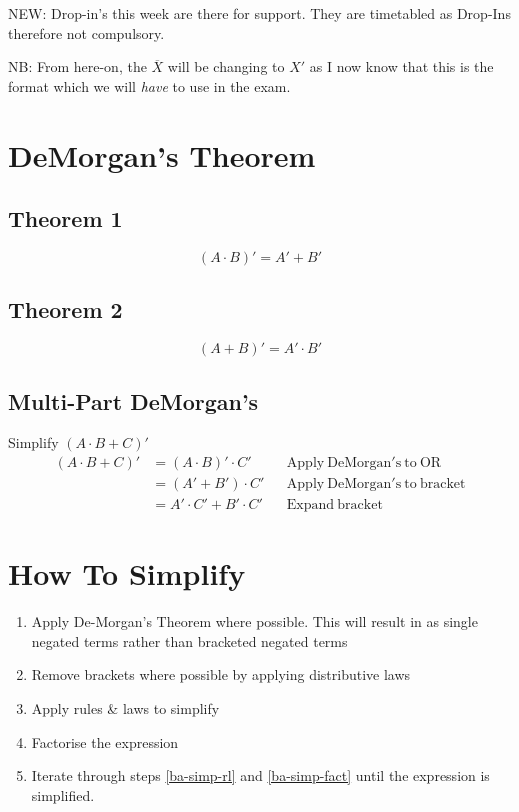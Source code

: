 NEW: Drop-in's this week are there for support. They are timetabled as Drop-Ins therefore not compulsory.

NB: From here-on, the $\overline{X}$ will be changing to $X'$ as I now know that this is the format which we will \textit{have} to use in the exam.

\section*{DeMorgan's Theorem}
\subsection*{Theorem 1}
\[(A \cdot B)' = A' + B'\]
\subsection*{Theorem 2}
\[(A+B)' = A' \cdot B'\]

\subsection*{Multi-Part DeMorgan's}
\begin{example}{Simplify $(A \cdot B + C)'$}
\begin{align*}
    (A \cdot B + C)' &= (A \cdot B)' \cdot C' && \mathrm{Apply\ DeMorgan's\ to\ OR}\\
    &= (A' + B') \cdot C' && \mathrm{Apply\ DeMorgan's\ to\ bracket}\\
    &= A' \cdot C' + B' \cdot C' && \mathrm{Expand\ bracket}
\end{align*}
\end{example}

\section*{How To Simplify}
\begin{enumerate}
    \item Apply De-Morgan's Theorem where possible. This will result in as single negated terms rather than bracketed negated terms
    \item Remove brackets where possible by applying distributive laws
    \item \label{ba-simp-rl} Apply rules \& laws to simplify
    \item \label{ba-simp-fact} Factorise the expression
    \item Iterate through steps \ref{ba-simp-rl} and \ref{ba-simp-fact} until the expression is simplified.
\end{enumerate}

